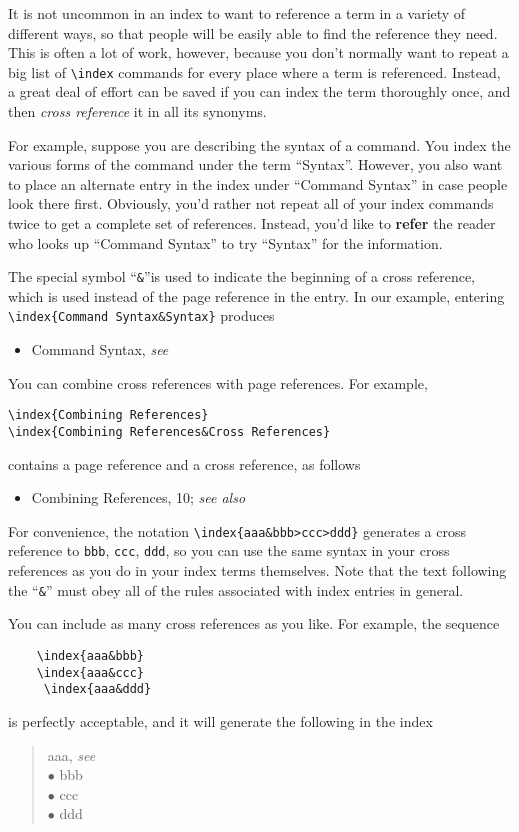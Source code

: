 It is not uncommon in an index to want to reference a
term in a variety of different ways, so that people will be easily able to find
the reference they need.  This is often a lot of work, however, because you
don't normally want to repeat a big list of \verb+\index+ commands for every 
place where a term is referenced.  Instead, a great deal of effort can be saved
if you can index the term thoroughly once, and then {\em cross reference\/} it
in all its synonyms.

For example, suppose you are describing the syntax of a command.  You index
the various forms of the command under the term ``Syntax''.  However, you also
want to place an alternate entry in the index under ``Command Syntax'' in case
people look there first.  Obviously, you'd rather not repeat all of your
index commands twice to get a complete set of references.  Instead, you'd like
to {\bf refer} the reader who looks up ``Command Syntax'' to try ``Syntax''
for the information.

The special symbol ``\verb+&+''is used to indicate the beginning of a cross
reference, which is used  instead of the page reference in the entry.  In our
example, entering \verb+\index{Command Syntax&Syntax}+ produces 
\begin{itemize} 
\item{Command Syntax, {\em see} }
\end{itemize} 
You can combine cross references with page references. 
For example, 
\begin{verbatim} 
\index{Combining References} 
\index{Combining References&Cross References} 
\end{verbatim} 
contains a page reference and a
cross reference, as follows 
\begin{itemize} 
\item{Combining References, \mbox{\rm 10}; {\em see also} }
\end{itemize} 
For convenience, the notation \verb+\index{aaa&bbb>ccc>ddd}+
generates a cross reference to \verb+bbb+, \verb+ccc+, \verb+ddd+, so you can
use the same syntax in your cross references as you do in your index terms
themselves.  Note that the text following the ``\verb+&+'' must obey all of the
rules associated with index entries in general.

You can include as many cross references as you like.  For example, the
sequence
\begin{verbatim}
    \index{aaa&bbb} 
    \index{aaa&ccc}  
     \index{aaa&ddd}
\end{verbatim}
is perfectly acceptable, and it will generate the following in the index 
\begin{quote}
\hspace*{10pt}aaa, {\em see} \\
\hspace*{40pt}$\bullet$ bbb \\
\hspace*{40pt}$\bullet$ ccc \\
\hspace*{40pt}$\bullet$ ddd
\end{quote}

